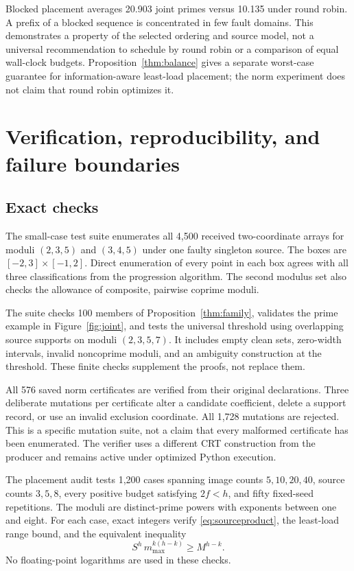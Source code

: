 \documentclass[11pt]{article}
\theoremstyle{definition}\newtheorem{definition}[theorem]{Definition}
\begin{document}
Blocked placement averages 20.903 joint primes versus 10.135 under round robin. A prefix of a blocked sequence is concentrated in few fault domains. This demonstrates a property of the selected ordering and source model, not a universal recommendation to schedule by round robin or a comparison of equal wall-clock budgets. Proposition~\ref{thm:balance} gives a separate worst-case guarantee for information-aware least-load placement; the norm experiment does not claim that round robin optimizes it.

\section{Verification, reproducibility, and failure boundaries}
\subsection{Exact checks}
The small-case test suite enumerates all 4,500 received two-coordinate arrays for moduli $(2,3,5)$ and $(3,4,5)$ under one faulty singleton source. The boxes are $[-2,3]\times[-1,2]$. Direct enumeration of every point in each box agrees with all three classifications from the progression algorithm. The second modulus set also checks the allowance of composite, pairwise coprime moduli.

The suite checks 100 members of Proposition~\ref{thm:family}, validates the prime example in Figure~\ref{fig:joint}, and tests the universal threshold using overlapping source supports on moduli $(2,3,5,7)$. It includes empty clean sets, zero-width intervals, invalid noncoprime moduli, and an ambiguity construction at the threshold. These finite checks supplement the proofs, not replace them.

All 576 saved norm certificates are verified from their original declarations. Three deliberate mutations per certificate alter a candidate coefficient, delete a support record, or use an invalid exclusion coordinate. All 1,728 mutations are rejected. This is a specific mutation suite, not a claim that every malformed certificate has been enumerated. The verifier uses a different CRT construction from the producer and remains active under optimized Python execution.

The placement audit tests 1,200 cases spanning image counts $5,10,20,40$, source counts $3,5,8$, every positive budget satisfying $2f<h$, and fifty fixed-seed repetitions. The moduli are distinct-prime powers with exponents between one and eight. For each case, exact integers verify \eqref{eq:sourceproduct}, the least-load range bound, and the equivalent inequality
\begin{equation}
 S^h\,m_{\max}^{k(h-k)}\ge M^{h-k}.
\end{equation}
No floating-point logarithms are used in these checks.
\end{document}
